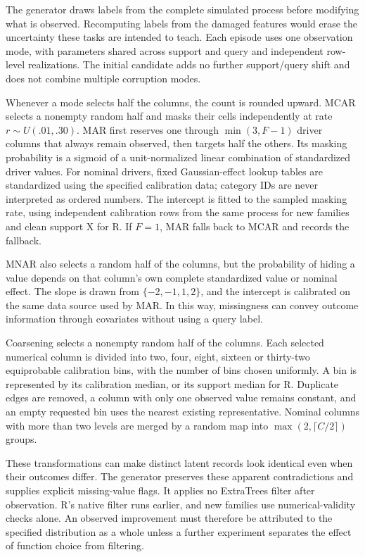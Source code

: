 \documentclass[11pt]{article}
\begin{document}
The generator draws labels from the complete simulated process before modifying what is observed. Recomputing labels from the damaged features would erase the uncertainty these tasks are intended to teach. Each episode uses one observation mode, with parameters shared across support and query and independent row-level realizations. The initial candidate adds no further support/query shift and does not combine multiple corruption modes.

Whenever a mode selects half the columns, the count is rounded upward. MCAR selects a nonempty random half and masks their cells independently at rate $r\sim U(.01,.30)$. MAR first reserves one through $\min(3,F-1)$ driver columns that always remain observed, then targets half the others. Its masking probability is a sigmoid of a unit-normalized linear combination of standardized driver values. For nominal drivers, fixed Gaussian-effect lookup tables are standardized using the specified calibration data; category IDs are never interpreted as ordered numbers. The intercept is fitted to the sampled masking rate, using independent calibration rows from the same process for new families and clean support X for R. If $F=1$, MAR falls back to MCAR and records the fallback.

MNAR also selects a random half of the columns, but the probability of hiding a value depends on that column's own complete standardized value or nominal effect. The slope is drawn from $\{-2,-1,1,2\}$, and the intercept is calibrated on the same data source used by MAR. In this way, missingness can convey outcome information through covariates without using a query label.

Coarsening selects a nonempty random half of the columns. Each selected numerical column is divided into two, four, eight, sixteen or thirty-two equiprobable calibration bins, with the number of bins chosen uniformly. A bin is represented by its calibration median, or its support median for R. Duplicate edges are removed, a column with only one observed value remains constant, and an empty requested bin uses the nearest existing representative. Nominal columns with more than two levels are merged by a random map into $\max(2,\lceil C/2\rceil)$ groups.

These transformations can make distinct latent records look identical even when their outcomes differ. The generator preserves these apparent contradictions and supplies explicit missing-value flags. It applies no ExtraTrees filter after observation. R's native filter runs earlier, and new families use numerical-validity checks alone. An observed improvement must therefore be attributed to the specified distribution as a whole unless a further experiment separates the effect of function choice from filtering.
\end{document}
